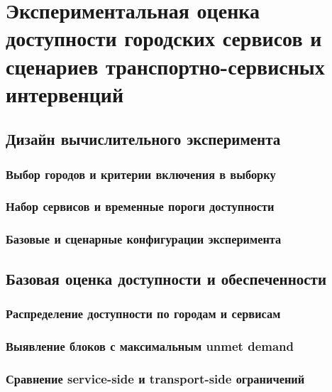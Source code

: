 \chapter{Экспериментальная оценка доступности городских сервисов и сценариев транспортно-сервисных интервенций}
\label{ch:experiments}

\section{Дизайн вычислительного эксперимента}
\label{sec:experiment-design}

\subsection{Выбор городов и критерии включения в выборку}
\label{subsec:city-selection}

\subsection{Набор сервисов и временные пороги доступности}
\label{subsec:service-thresholds}

\subsection{Базовые и сценарные конфигурации эксперимента}
\label{subsec:baseline-scenario-configs}

\section{Базовая оценка доступности и обеспеченности}
\label{sec:baseline-accessibility}

\subsection{Распределение доступности по городам и сервисам}
\label{subsec:accessibility-distribution}

\subsection{Выявление блоков с максимальным unmet demand}
\label{subsec:unmet-demand-blocks}

\subsection{Сравнение service-side и transport-side ограничений}
\label{subsec:service-transport-limitations}

